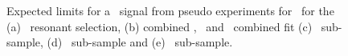 \begin{figure}[p]
 \caption{Expected limits for a \qstar\ signal from  pseudo experiments for \integLumi\ for the 
 (a) \JJ\ resonant selection, (b) combined \QQ, \QG\ and \GG\ combined fit (c) \QQ\ sub-sample, (d) \QG\ sub-sample 
 and (e)  \GG\ sub-sample.
 \label{fig:toyMCExpectedLimitsqstar}}
\end{figure}





